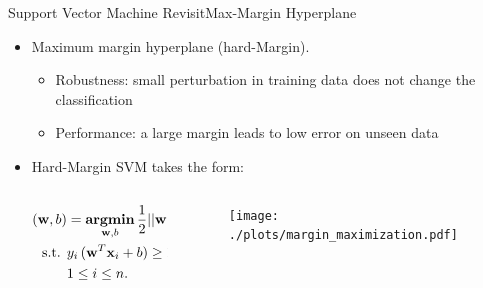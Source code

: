 \documentclass[first=dgreen,second=purple,logo=yellowexc]{aaltoslides}
\newcommand{\argmin}{\textbf{argmin}}
\newcommand{\xb}{{\bf x}}
\newcommand{\wb}{{\bf w}}
\begin{document}
\begin{frame}{Support Vector Machine Revisit}{Max-Margin Hyperplane}
\begin{itemize}
    \item Maximum margin hyperplane (hard-Margin).
    \begin{itemize}
        \item Robustness: small perturbation in training data does not change the classification
        \item Performance: a large margin leads to low error on unseen data
    \end{itemize}
    \item Hard-Margin SVM takes the form:
    \begin{columns}
        \begin{column}{.5\linewidth}
            \begin{align*}
            (\wb,b) & = \underset{\wb,b}{\operatorname{\argmin}} \, \frac{1}{2} ||\wb||^2,\\
            \text{ s.t. } & y_i\,(\wb^T\xb_i + b) \ge 1,\\
            & 1 \leq i \leq n. \nonumber
            \end{align*}
        \end{column}
        \begin{column}{.5\linewidth}
            \begin{figure}
                \texttt{[image: ./plots/margin\_maximization.pdf]}
            \end{figure}
        \end{column}
    \end{columns}
\end{itemize}
\end{frame}
\end{document}
